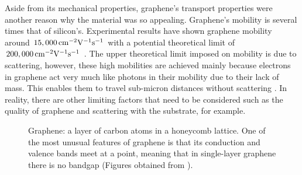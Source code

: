 \noindent Aside from its mechanical properties, graphene's transport properties were another reason why the material was so appealing. Graphene's mobility is several times that of silicon's. Experimental results have shown graphene mobility around $15,000\,\mathrm{cm}^{-2}\mathrm{V}^{-1}\mathrm{s}^{-1}$ with a potential theoretical limit of $200,000\,\mathrm{cm}^{-2}\mathrm{V}^{-1}\mathrm{s}^{-1}$ \cite{Dargys_Encylco1994,Akinwande_NatureComm2014}. The upper theoretical limit imposed on mobility is due to scattering, however, these high mobilities are achieved mainly because electrons in graphene act very much like photons in their mobility due to their lack of mass. This enables them to travel sub-micron distances without scattering \cite{Novoselov_NatureMat2007}. In reality, there are other limiting factors that need to be considered such as the quality of graphene and scattering with the substrate, for example. 
\begin{figure}[ht]
	\centering
	\qquad
	\caption[Lattice and band structure of graphene]{\protect{} Graphene: a layer of carbon atoms in a honeycomb lattice. \protect{} One of the most unusual features of graphene is that its conduction and valence bands meet at a point, meaning that in single-layer graphene there is no bandgap (Figures obtained from \cite{Berkley_Online2009}).}
	\label{fig:graphene_structures}
\end{figure}

